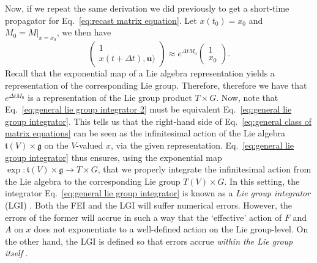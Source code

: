  Now, if we repeat the same derivation we did previously to get a short-time propagator for Eq.~\ref{eq:recast matrix equation}. Let $x(t_0) = x_0$ and $M_0 = M|_{x = x_0}$, we then have
\begin{equation} \label{eq:general lie group integrator 2}
	\begin{pmatrix}
		1 \\ x(t + \Delta t), \mathbf{u})
	\end{pmatrix} \approx e^{\Delta t M_0} \begin{pmatrix}
		1 \\ x_0
	\end{pmatrix}.
\end{equation}
Recall that the exponential map of a Lie algebra representation yields a representation of the corresponding Lie group. Therefore, therefore we have that $e^{\Delta t M_0}$ is a representation of the Lie group product $T \times G$. Now, note that Eq.~\ref{eq:general lie group integrator 2} must be equivalent Eq.~\ref{eq:general lie group integrator}. This tells us that the right-hand side of Eq.~\ref{eq:general class of matrix equations} can be seen as the infinitesimal action of the Lie algebra $\mathfrak{t}(V) \times \mathfrak{g}$ on the $V$-valued $x$, via the given representation. Eq.~\ref{eq:general lie group integrator} thus ensures, using the exponential map $\exp : \mathfrak{t}(V) \times \mathfrak{g} \to T \times G$, that we properly integrate the infinitesimal action from the Lie algebra to the corresponding Lie group $T(V) \times G$. In this setting, the integrator Eq.~\ref{eq:general lie group integrator} is known as a \textit{Lie group integrator} (LGI) \citep{celledoniIntroductionLieGroup2014c, owrenLieGroupIntegrators2016, iserlesLiegroupMethods2005, celledoniLieGroupIntegrators2022a}. Both the FEI and the LGI will suffer numerical errors. However, the errors of the former will accrue in such a way that the `effective' action of $F$ and $A$ on $x$ does not exponentiate to a well-defined action on the Lie group-level. On the other hand, the LGI is defined so that errors accrue \textit{within the Lie group itself} \citep{iserlesLiegroupMethods2005}.



